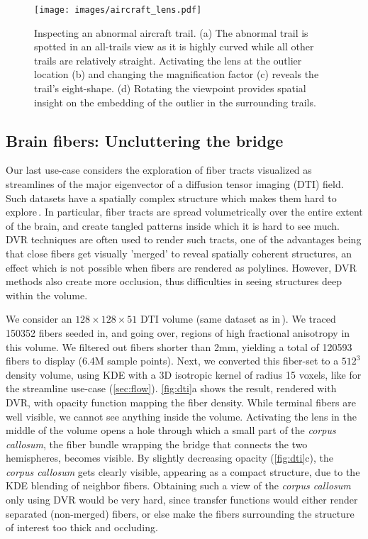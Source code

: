 \begin{figure}
\centering
\texttt{[image: images/aircraft\_lens.pdf]}
\caption[Inspecting an abnormal aircraft trail.]{Inspecting an abnormal aircraft trail. (a) The abnormal trail is spotted in an all-trails view as it is highly curved while all other trails are relatively straight. Activating the lens at the outlier location (b) and changing the magnification factor (c) reveals the trail's eight-shape. (d) Rotating the viewpoint provides spatial insight on the embedding of the outlier in the surrounding trails.}
\label{f:aircraft_lens}
\end{figure}
%

\subsection{Brain fibers: Uncluttering the bridge}
\label{sec:dti}
%
Our last use-case considers the exploration of fiber tracts visualized as streamlines of the major eigenvector of a diffusion tensor imaging (DTI) field. Such datasets have a spatially complex structure which makes them hard to explore\,\cite{assaf08}. In particular, fiber tracts are spread volumetrically over the entire extent of the brain, and create tangled patterns inside which it is hard to see much. DVR techniques are often used to render such tracts, one of the advantages being that close fibers get visually 'merged' to reveal spatially coherent structures, an effect which is not possible when fibers are rendered as polylines. However, DVR methods also create more occlusion, thus difficulties in seeing structures deep within the volume.

We consider an $128 \times 128 \times 51$ DTI volume (same dataset as in\,\cite{everts15}). We traced 150352 fibers seeded in, and going over, regions of high fractional anisotropy in this volume. We filtered out fibers shorter than 2mm, yielding a total of 120593 fibers to display (6.4M sample points). Next, we converted this fiber-set to a $512^3$ density volume, using KDE with a 3D isotropic kernel of radius 15 voxels, like for the streamline use-case (\autoref{sec:flow}). \autoref{fig:dti}a shows the result, rendered with DVR, with opacity function mapping the fiber density. While terminal fibers are well visible, we cannot see anything inside the volume. Activating the lens in the middle of the volume opens a hole through which a small part of the \emph{corpus callosum}, the fiber bundle wrapping the bridge that connects the two hemispheres, becomes visible. By slightly decreasing opacity (\autoref{fig:dti}c), the \emph{corpus callosum} gets clearly visible, appearing as a compact structure, due to the KDE blending of neighbor fibers. Obtaining such a view of the \emph{corpus callosum} only using DVR would be very hard, since transfer functions would either render separated (non-merged) fibers, or else make the fibers surrounding the structure of interest too thick and occluding. 

